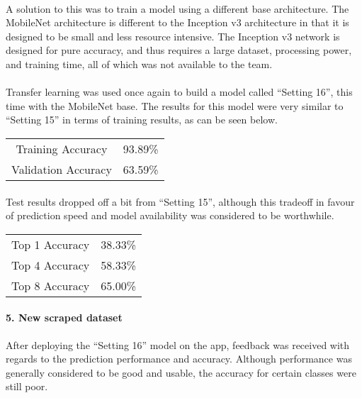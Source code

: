 \documentclass[a4paper, 11pt]{article}
\begin{document}
        \paragraph{}
        A solution to this was to train a model using a different base architecture. The MobileNet architecture is different to the Inception v3 architecture in that it is designed to be small and less resource intensive. The Inception v3 network is designed for pure accuracy, and thus requires a large dataset, processing power, and training time, all of which was not available to the team.
        \paragraph{}
        Transfer learning was used once again to build a model called “Setting 16”, this time with the MobileNet base. The results for this model were very similar to “Setting 15” in terms of training results, as can be seen below.
        \begin{center}
        \begin{tabular}{ |c|c| } 
         \hline
         Training Accuracy & 93.89\%\\
         Validation Accuracy & 63.59\%\\
         \hline
        \end{tabular}
        \end{center}
        \paragraph{}
        Test results dropped off a bit from “Setting 15”, although this tradeoff in favour of prediction speed and model availability was considered to be worthwhile.
        \begin{center}
        \begin{tabular}{ |c|c| } 
         \hline
         Top 1 Accuracy & 38.33\%\\
         Top 4 Accuracy & 58.33\%\\
         Top 8 Accuracy & 65.00\%\\
         \hline
        \end{tabular}
        \end{center}
        
        \paragraph{5. New scraped dataset}
        After deploying the “Setting 16” model on the app, feedback was received with regards to the prediction performance and accuracy. Although performance was generally considered to be good and usable, the accuracy for certain classes were still poor.
\end{document}
